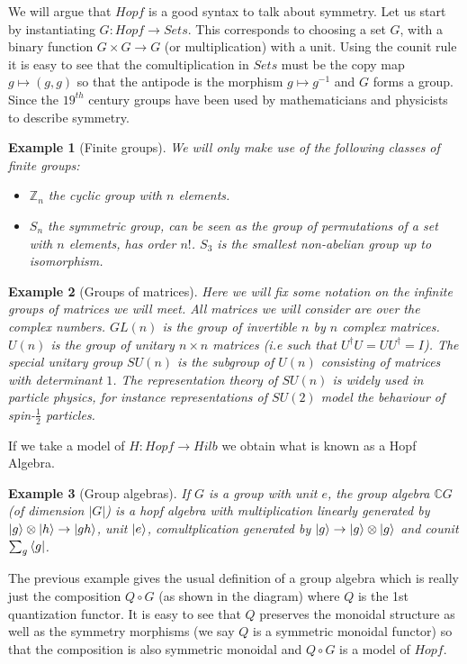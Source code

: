 \documentclass{article}
\newtheorem{example}{Example}
\begin{document}
We will argue that $Hopf$ is a good syntax to talk about symmetry. Let us start by  instantiating $G: Hopf \rightarrow Sets$. This corresponds to choosing a set $G$, with a binary function $G \times G \rightarrow G$ (or multiplication) with a unit. Using the counit rule it is easy to see that the comultiplication in $Sets$ must be the copy map $g \mapsto (g,g)$ so that the antipode is the morphism $g \mapsto g^{-1}$ and $G$ forms a group. Since the $19^{th}$ century groups have been used by mathematicians and physicists to describe symmetry.
\begin{example}[Finite groups]
	We will only make use of the following classes of finite groups:
	\begin{itemize}
		\item $\mathbb{Z}_n$ the cyclic group with $n$ elements.
		\item $S_n$ the symmetric group, can be seen as the group of permutations of a set with $n$ elements, has order $n!$. $S_3$ is the smallest non-abelian group up to isomorphism.  
	\end{itemize}
\end{example}
\begin{example}[Groups of matrices]
	Here we will fix some notation on the infinite groups of matrices we will meet. All matrices we will consider are over the complex numbers. $GL(n)$ is the group of invertible $n$ by $n$ complex matrices. $U(n)$ is the group of unitary $n \times n$ matrices (i.e such that $U^{\dagger}U = UU^\dagger = I$). The special unitary group $SU(n)$ is the subgroup of $U(n)$ consisting of matrices with determinant $1$. The representation theory of $SU(n)$ is widely used in particle physics, for instance representations of $SU(2)$ model the behaviour of spin-$\frac{1}{2}$ particles. 
\end{example}
If we take a model of $H:Hopf \rightarrow Hilb$ we obtain what is known as a Hopf Algebra.
\begin{example}[Group algebras]
	If $G$ is a group with unit $e$, the group algebra $\mathbb{C}G$ (of dimension $|G|$) is a hopf algebra with multiplication linearly generated by $\ket{g}\otimes \ket{h} \rightarrow \ket{gh}$, unit $\ket{e}$, comultplication generated by $\ket{g} \rightarrow \ket{g} \otimes \ket{g}$ and counit $\sum_g \bra{g}$.
\end{example}
The previous example gives the usual definition of a group algebra which is really just the composition $Q \circ G$ (as shown in the diagram) where $Q$ is the 1st quantization functor. It is easy to see that $Q$ preserves the monoidal structure as well as the symmetry morphisms (we say $Q$ is a symmetric monoidal functor) so that the composition is also symmetric monoidal and $Q \circ G$ is a model of $Hopf$.
\end{document}
